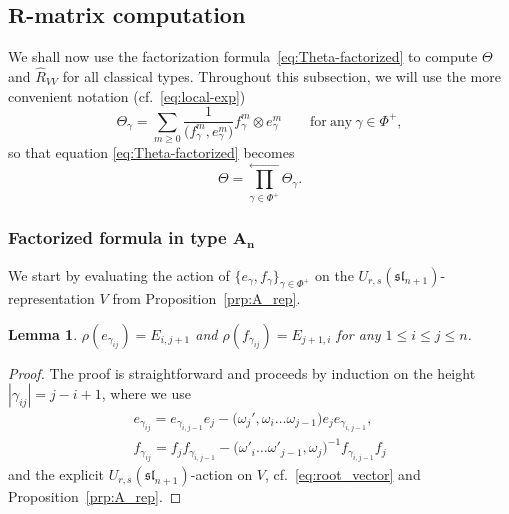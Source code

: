 \documentclass[10pt,a4paper]{amsart}
\numberwithin{equation}{section}
\newtheorem{Lemma}[Theorem]{Lemma}
\newcommand{\ssl}{\mathfrak{sl}}
\begin{document}
\subsection[R-matrix computation]{$\boldsymbol{R}$-matrix computation}\label{ssec:R-Matrix-Computation}

We shall now use the factorization formula~\eqref{eq:Theta-factorized} to compute $\Theta$ and $\hat{R}_{VV}$ for all classical types.
Throughout this subsection, we will use the more convenient notation (cf.\ \eqref{eq:local-exp})
\begin{equation}\label{eq:local-Theta}
 \Theta_{\gamma} = \sum_{m \ge 0}\frac{1}{\bigl(f_{\gamma}^{m},e_{\gamma}^{m}\bigr)}f_{\gamma}^{m} \otimes e_{\gamma}^{m}
 \qquad \mathrm{for\ any} \ \gamma \in \Phi^{+},
\end{equation}
so that equation \eqref{eq:Theta-factorized} becomes
\begin{displaymath}
 \Theta = \overset{\longleftarrow}{\underset{\gamma \in \Phi^{+}}{\prod}}\Theta_{\gamma}.
\end{displaymath}

\subsubsection[Factorized formula in type A\_n]{Factorized formula in type $\boldsymbol{A_{n}}$}

We start by evaluating the action of $\{e_\gamma,f_\gamma\}_{\gamma\in \Phi^+}$ on the $U_{r,s}(\ssl_{n+1})$-representation $V$ from Proposition~\ref{prp:A_rep}.

\begin{Lemma}
$\rho(e_{\gamma_{ij}}) = E_{i,j + 1}$ and $\rho(f_{\gamma_{ij}}) = E_{j + 1,i}$ for any $1\leq i\leq j\leq n$.
\end{Lemma}

\begin{proof}
The proof is straightforward and proceeds by induction on the height $|\gamma_{ij}|=j-i+1$, where we use
\begin{gather*}
 e_{\gamma_{ij}}=e_{\gamma_{i,j-1}}e_{j} - \bigl(\omega_j',\omega_i \dots \omega_{j-1}\bigr) e_{j}e_{\gamma_{i,j-1}},\\
 f_{\gamma_{ij}} = f_{j}f_{\gamma_{i,j-1}}  - \bigl(\omega'_i\dots \omega'_{j-1},\omega_j\bigr)^{-1} f_{\gamma_{i,j-1}}f_{j}
\end{gather*}
and the explicit $U_{r,s}(\ssl_{n+1})$-action on $V$, cf.\ \eqref{eq:root_vector} and Proposition~\ref{prp:A_rep}.
\end{proof}
\end{document}
